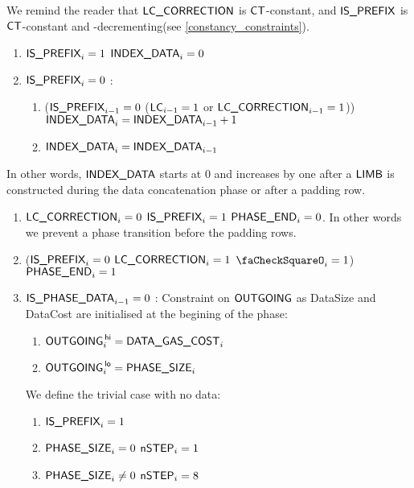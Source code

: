 \begin{center}
\end{center}

We remind the reader that $\textsf{LC\_CORRECTION}$ is $\textsf{CT}$-constant, and $\textsf{IS\_PREFIX}$ is $\textsf{CT}$-constant and \phaseData{}-decrementing(see \ref{constancy_constraints}).
\begin{enumerate}
    \item \If $\textsf{IS\_PREFIX}_{i}=1$ \Then $\textsf{INDEX\_DATA}_{i}=0$
    \item \If $\textsf{IS\_PREFIX}_{i}=0$ \Then: 
    \begin{enumerate}
        \item \If ($\textsf{IS\_PREFIX}_{i-1}=0$ \et ($\textsf{LC}_{i-1}=1$ or $\textsf{LC\_CORRECTION}_{i-1}=1$)) \Then $\textsf{INDEX\_DATA}_{i}=\textsf{INDEX\_DATA}_{i-1} + 1$
        \item \Else $\textsf{INDEX\_DATA}_{i}=\textsf{INDEX\_DATA}_{i-1}$
    \end{enumerate}
\end{enumerate}
In other words, $\textsf{INDEX\_DATA}$ starts at 0 and increases by one after a $\textsf{LIMB}$ is constructed during the data concatenation phase or after a padding row. %
\begin{enumerate}[resume]
    \item \If $\textsf{LC\_CORRECTION}_{i} = 0$ \Or $\textsf{IS\_PREFIX}_{i}=1$ \Then $\textsf{PHASE\_END}_{i}=0$. In other words we prevent a phase transition before the padding rows.
    \item \If ($\textsf{IS\_PREFIX}_{i}=0$ \et $\textsf{LC\_CORRECTION}_{i} = 1$ \et $\done_{i}=1$) \Then $\textsf{PHASE\_END}_{i}=1$
    \item \If $\textsf{IS\_PHASE\_DATA}_{i-1}=0$ \Then:
    Constraint on $\textsf{OUTGOING}$ as DataSize and DataCost are initialised at the begining of the phase:
    \begin{enumerate}
        \item $\textsf{OUTGOING}^{\mathsf{\,hi}}_{i}=\textsf{DATA\_GAS\_COST}_{i}$
        \item $\textsf{OUTGOING}^{\mathsf{\,lo}}_{i}=\textsf{PHASE\_SIZE}_{i}$
    \end{enumerate} 
    We define the trivial case with no data:
    \begin{enumerate}[resume]
        \item $\textsf{IS\_PREFIX}_{i}=1$
        \item \If $\textsf{PHASE\_SIZE}_{i}=0$ \Then $\textsf{nSTEP}_{i}=1$
        \item \If $\textsf{PHASE\_SIZE}_{i} \neq 0$ \Then $\textsf{nSTEP}_{i}=8$ 
    \end{enumerate}
\end{enumerate}
